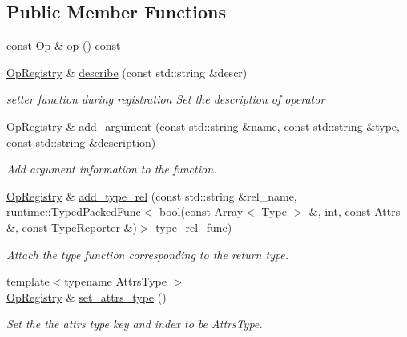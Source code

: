\subsection*{Public Member Functions}
\begin{DoxyCompactItemize}
\item 
const \hyperlink{classtvm_1_1Op}{Op} \& \hyperlink{classtvm_1_1OpRegistry_a381093d9c0d1177baef90f4b25828e21}{op} () const 
\item 
\hyperlink{classtvm_1_1OpRegistry}{Op\+Registry} \& \hyperlink{classtvm_1_1OpRegistry_a0a72aecfe0d1b5d65f8518a70febb4bc}{describe} (const std\+::string \&descr)
\begin{DoxyCompactList}\small\item\em setter function during registration Set the description of operator \end{DoxyCompactList}\item 
\hyperlink{classtvm_1_1OpRegistry}{Op\+Registry} \& \hyperlink{classtvm_1_1OpRegistry_a5d15fca747762cf20a5c1881cbe661ff}{add\+\_\+argument} (const std\+::string \&name, const std\+::string \&type, const std\+::string \&description)
\begin{DoxyCompactList}\small\item\em Add argument information to the function. \end{DoxyCompactList}\item 
\hyperlink{classtvm_1_1OpRegistry}{Op\+Registry} \& \hyperlink{classtvm_1_1OpRegistry_a7db583af58b340af8a5784cc858b507e}{add\+\_\+type\+\_\+rel} (const std\+::string \&rel\+\_\+name, \hyperlink{classtvm_1_1runtime_1_1TypedPackedFunc}{runtime\+::\+Typed\+Packed\+Func}$<$ bool(const \hyperlink{classtvm_1_1Array}{Array}$<$ \hyperlink{classtvm_1_1Type}{Type} $>$ \&, int, const \hyperlink{classtvm_1_1Attrs}{Attrs} \&, const \hyperlink{classtvm_1_1TypeReporter}{Type\+Reporter} \&)$>$ type\+\_\+rel\+\_\+func)
\begin{DoxyCompactList}\small\item\em Attach the type function corresponding to the return type. \end{DoxyCompactList}\item 
{\footnotesize template$<$typename Attrs\+Type $>$ }\\\hyperlink{classtvm_1_1OpRegistry}{Op\+Registry} \& \hyperlink{classtvm_1_1OpRegistry_aafc6025ac5b10313e69c84130ee5cca0}{set\+\_\+attrs\+\_\+type} ()
\begin{DoxyCompactList}\small\item\em Set the the attrs type key and index to be Attrs\+Type. \end{DoxyCompactList}\item 

\end{DoxyCompactItemize}
